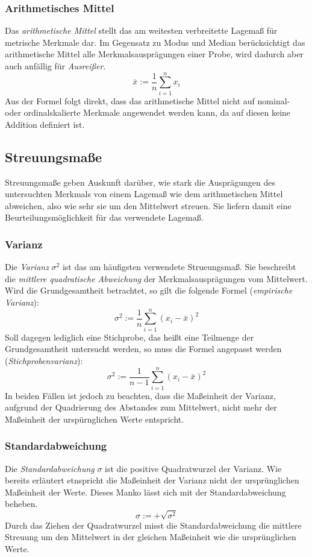\documentclass[fontsize=11pt]{scrartcl}
\begin{document}
                    \subsubsection{Arithmetisches Mittel}
                        Das \emph{arithmetische Mittel} stellt das am weitesten verbreitette Lagemaß für metrische Merkmale dar. Im Gegensatz zu Modus und Median berücksichtigt das arithmetische Mittel alle Merkmalsausprägungen einer Probe, wird dadurch aber auch anfällig für \emph{Ausreißer}.
                        $$ \bar{x} := \frac{1}{n}\sum_{i=1}^nx_i $$ 
                        Aus der Formel folgt direkt, dass das arithmetische Mittel nicht auf nominal- oder ordinalskalierte Merkmale angewendet werden kann, da auf diesen keine Addition definiert ist.

                \subsection{Streuungsmaße}
                    Streuungsmaße geben Auskunft darüber, wie stark die Ausprägungen des untersuchten Merkmals von einem Lagemaß wie dem arithmetischen Mittel abweichen, also wie sehr sie um den Mittelwert streuen. Sie liefern damit eine Beurteilungsmöglichkeit für das verwendete Lagemaß.\cite{ertel2016,kohn2005}
                    \subsubsection{Varianz}
                        Die \emph{Varianz} $\sigma^2$ ist das am häufigsten verwendete Strueungsmaß. Sie beschreibt die \emph{mittlere quadratische Abweichung} der Merkmalsausprägungen vom Mittelwert.
                        Wird die Grundgesamtheit betrachtet, so gilt die folgende Formel (\emph{empirische Varianz}): 
                        $$ \sigma^2 := \frac{1}{n}\sum_{i=1}^n(x_i - \bar{x})^2 $$
                        Soll dagegen lediglich eine Stichprobe, das heißt eine Teilmenge der Grundgesamtheit untersucht werden, so muss die Formel angepasst werden (\emph{Stichprobenvarianz}):
                        $$ \sigma^2 := \frac{1}{n-1}\sum_{i=1}^n(x_i - \bar{x})^2  $$
                        In beiden Fällen ist jedoch zu beachten, dass die Maßeinheit der Varianz, aufgrund der Quadrierung des Abstandes zum Mittelwert, nicht mehr der Maßeinheit der urspürnglichen Werte entspricht.\cite{kohn2005}
                    \subsubsection{Standardabweichung}
                        Die \emph{Standardabweichung} $\sigma$ ist die positive Quadratwurzel der Varianz. Wie bereits erläutert etnspricht die Maßeinheit der Varianz nicht der ursprünglichen Maßeinheit der Werte. Dieses Manko lässt sich mit der Standardabweichung beheben.
                        $$ \sigma := + \sqrt{\sigma^2} $$
                        Durch das Ziehen der Quadratwurzel misst die Standardabweichung die mittlere Streuung um den Mittelwert in der gleichen Maßeinheit wie die ursprünglichen Werte.\cite{kohn2005}
\end{document}
